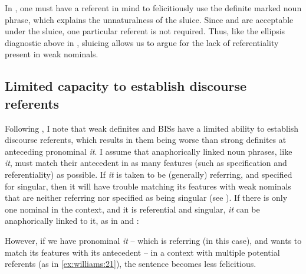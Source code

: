 \documentclass[output=paper,
modfonts
]{langscibook}
\begin{document}
In , one must have a referent in mind to felicitiously use the definite marked noun phrase, which explains the unnaturalness of the sluice. Since  and  are acceptable under the sluice, one particular referent is not required. Thus, like the ellipsis diagnostic above in , sluicing allows us to argue for the lack of referentiality present in weak nominals. 


\subsection{Limited capacity to establish discourse referents}\label{sec:williams:2.4} 

Following \citet[182]{Aguilar-GuevaraZwarsts2011}, I note that weak definites and BISs have a limited ability to establish discourse referents, which results in them being  worse than strong definites at anteceding pronominal \textit{it}. I assume that anaphorically linked noun phrases, like \textit{it}, must match their antecedent in as many features (such as  specification and referentiality) as possible. If \textit{it} is taken to be (generally) referring, and specified for singular, then it will have trouble matching its features with weak nominals that are neither referring nor specified as being singular (see ). If there is only one nominal in the context, and it is referential and singular, \textit{it} can be anaphorically linked to it, as in  and :

\begin{exe} 
\end{exe}

However, if we have pronominal \textit{it} -- which is referring (in this case), and wants to match its  features with its antecedent -- in a context with multiple potential referents (as in \ref{ex:williams:21}), the sentence becomes less felicitious.

\begin{exe}
\end{exe}    
\end{document}
